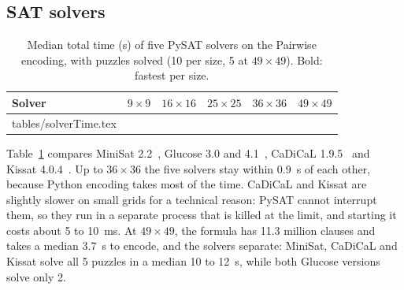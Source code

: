 \subsection{SAT solvers}

\begin{table}[t]
\caption{Median total time (s) of five PySAT solvers on the Pairwise encoding, with puzzles solved (10 per size, 5 at $49\times49$). Bold: fastest per size.}\label{tab:solvers}
\centering\small
\begin{tabular}{lrrrrr}
\toprule
Solver & $9\times9$ & $16\times16$ & $25\times25$ & $36\times36$ & $49\times49$ \\
\midrule
{} tables/solverTime.tex 
\bottomrule
\end{tabular}
\end{table}

Table~\ref{tab:solvers} compares MiniSat 2.2~\cite{minisat}, Glucose 3.0 and 4.1~\cite{glucose}, CaDiCaL 1.9.5~\cite{cadical} and Kissat 4.0.4~\cite{kissat}. Up to $36\times36$ the five solvers stay within 0.9~s of each other, because Python encoding takes most of the time. CaDiCaL and Kissat are slightly slower on small grids for a technical reason: PySAT cannot interrupt them, so they run in a separate process that is killed at the limit, and starting it costs about 5 to 10~ms. At $49\times49$, the formula has 11.3 million clauses and takes a median 3.7~s to encode, and the solvers separate: MiniSat, CaDiCaL and Kissat solve all 5 puzzles in a median 10 to 12~s, while both Glucose versions solve only 2.


